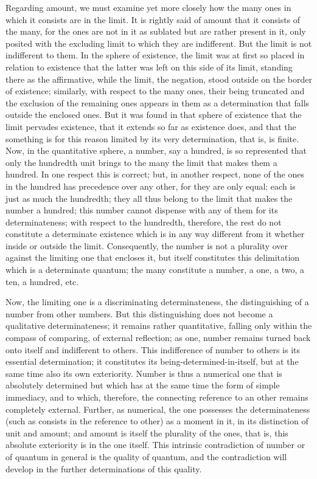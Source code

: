 Regarding amount, we must examine yet more closely
how the many ones in which it consists are in the limit.
It is rightly said of amount that it consists of the many,
for the ones are not in it as sublated but are rather present in it,
only posited with the excluding limit
to which they are indifferent.
But the limit is not indifferent to them.
In the sphere of existence, the limit was
at first so placed in relation to existence
that the latter was left on this side of its limit,
standing there as the affirmative,
while the limit, the negation,
stood outside on the border of existence;
similarly, with respect to the many ones,
their being truncated and the exclusion of the remaining ones
appears in them as a determination
that falls outside the enclosed ones.
But it was found in that sphere of existence
that the limit pervades existence,
that it extends so far as existence does,
and that the something is for this reason
limited by its very determination, that is, is finite.
Now, in the quantitative sphere, a number, say a hundred,
is so represented that only the hundredth unit brings to the many
the limit that makes them a hundred.
In one respect this is correct;
but, in another respect, none of the ones in the hundred
has precedence over any other, for they are only equal;
each is just as much the hundredth;
they all thus belong to the limit that
makes the number a hundred;
this number cannot dispense with
any of them for its determinateness;
with respect to the hundredth, therefore,
the rest do not constitute a determinate existence
which is in any way different from it
whether inside or outside the limit.
Consequently, the number is not a plurality
over against the limiting one that encloses it,
but itself constitutes this delimitation
which is a determinate quantum;
the many constitute a number,
a one, a two, a ten, a hundred, etc.

Now, the limiting one is a discriminating determinateness,
the distinguishing of a number from other numbers.
But this distinguishing does not become
a qualitative determinateness;
it remains rather quantitative,
falling only within the compass
of comparing, of external reflection;
as one, number remains turned back onto itself
and indifferent to others.
This indifference of number to others
is its essential determination;
it constitutes its being-determined-in-itself,
but at the same time also its own exteriority.
Number is thus a numerical one that is absolutely determined
but which has at the same time the form of simple immediacy,
and to which, therefore, the connecting reference to
an other remains completely external.
Further, as numerical, the one possesses the determinateness
(such as consists in the reference to other) as a moment in it,
in its distinction of unit and amount;
and amount is itself the plurality of the ones,
that is, this absolute exteriority is in the one itself.
This intrinsic contradiction of number
or of quantum in general is the quality of quantum,
and the contradiction will develop in
the further determinations of this quality.

